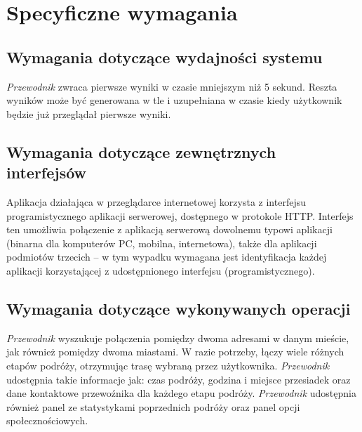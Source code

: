 \documentclass[12pt,a4paper]{report}
\begin{document}
\section{Specyficzne wymagania}
\subsection{Wymagania dotyczące wydajności systemu}
	\emph{Przewodnik} zwraca pierwsze wyniki w czasie mniejszym niż 5 sekund. Reszta wyników może być generowana w tle i uzupełniana w czasie kiedy użytkownik będzie już przeglądał pierwsze wyniki.

\subsection{Wymagania dotyczące zewnętrznych interfejsów}
Aplikacja działająca w przeglądarce internetowej korzysta z interfejsu programistycznego aplikacji serwerowej, dostępnego w protokole HTTP. Interfejs ten umożliwia połączenie z aplikacją serwerową dowolnemu typowi aplikacji (binarna dla komputerów PC, mobilna, internetowa), także dla aplikacji podmiotów trzecich -- w tym wypadku wymagana jest identyfikacja każdej aplikacji korzystającej z udostępnionego interfejsu (programistycznego).
\subsection{Wymagania dotyczące wykonywanych operacji}
	\emph{Przewodnik} wyszukuje połączenia pomiędzy dwoma adresami w danym mieście, jak również pomiędzy dwoma miastami. W razie potrzeby, łączy wiele różnych etapów podróży, otrzymując trasę wybraną przez użytkownika. \emph{Przewodnik} udostępnia takie informacje jak: czas podróży, godzina i miejsce przesiadek oraz dane kontaktowe przewoźnika dla każdego etapu podróży. \emph{Przewodnik} udostępnia również panel ze statystykami poprzednich podróży oraz panel opcji społecznościowych.
\newpage
\end{document}
